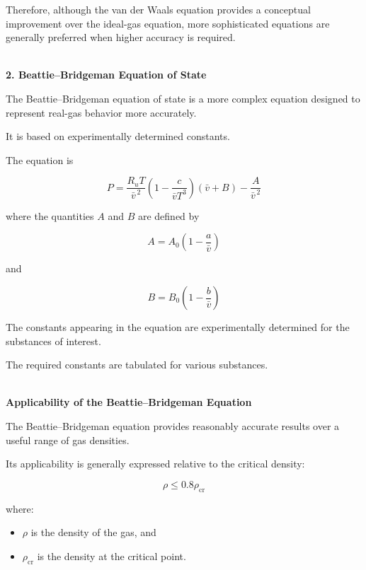 \documentclass[12pt]{article}
\begin{document}
Therefore, although the van der Waals equation provides a conceptual improvement over the ideal-gas equation, more sophisticated equations are generally preferred when higher accuracy is required.

\textbf{\\ 2. Beattie--Bridgeman Equation of State}

The Beattie--Bridgeman equation of state is a more complex equation designed to represent real-gas behavior more accurately.

It is based on experimentally determined constants.

The equation is

\begin{equation*}
\boxed{
P=
\frac{R_uT}{\bar{v}^{\,2}}
\left(1-\frac{c}{\bar{v}T^3}\right)
(\bar{v}+B)
-\frac{A}{\bar{v}^{\,2}}
}
\end{equation*}

where the quantities $A$ and $B$ are defined by

\begin{equation*}
\boxed{
A=A_0\left(1-\frac{a}{\bar{v}}\right)
}
\end{equation*}

and

\begin{equation*}
\boxed{
B=B_0\left(1-\frac{b}{\bar{v}}\right)
}
\end{equation*}

The constants appearing in the equation are experimentally determined for the substances of interest.

The required constants are tabulated for various substances.

\textbf{\\ Applicability of the Beattie--Bridgeman Equation}

The Beattie--Bridgeman equation provides reasonably accurate results over a useful range of gas densities.

Its applicability is generally expressed relative to the critical density:

\begin{equation*}
\boxed{
\rho\leq0.8\rho_{\mathrm{cr}}
}
\end{equation*}

where:
\begin{itemize}
    \item $\rho$ is the density of the gas, and
    \item $\rho_{\mathrm{cr}}$ is the density at the critical point.
\end{itemize}
\end{document}
